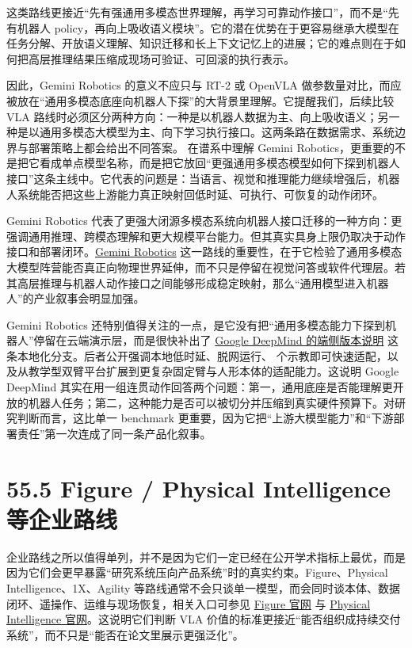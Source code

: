这类路线更接近“先有强通用多模态世界理解，再学习可靠动作接口”，而不是“先有机器人 policy，再向上吸收语义模块”。它的潜在优势在于更容易继承大模型在任务分解、开放语义理解、知识迁移和长上下文记忆上的进展；它的难点则在于如何把高层推理结果压缩成现场可验证、可回滚的执行表示。

因此，Gemini Robotics 的意义不应只与 RT-2 或 OpenVLA 做参数量对比，而应被放在“通用多模态底座向机器人下探”的大背景里理解。它提醒我们，后续比较 VLA 路线时必须区分两种方向：一种是以机器人数据为主、向上吸收语义；另一种是以通用多模态大模型为主、向下学习执行接口。这两条路在数据需求、系统边界与部署策略上都会给出不同答案。 在谱系中理解 Gemini Robotics，更重要的不是把它看成单点模型名称，而是把它放回“更强通用多模态模型如何下探到机器人接口”这条主线中。它代表的问题是：当语言、视觉和推理能力继续增强后，机器人系统能否把这些上游能力真正映射回低时延、可执行、可恢复的动作闭环。

Gemini Robotics 代表了更强大闭源多模态系统向机器人接口迁移的一种方向：更强调通用推理、跨模态理解和更大规模平台能力。但其真实具身上限仍取决于动作接口和部署闭环。\href{https://deepmind.google/blog/gemini-robotics-brings-ai-into-the-physical-world/}{Gemini Robotics} 这一路线的重要性，在于它检验了通用多模态大模型阵营能否真正向物理世界延伸，而不只是停留在视觉问答或软件代理层。若其高层推理与机器人动作接口之间能够形成稳定映射，那么“通用模型进入机器人”的产业叙事会明显加强。

Gemini Robotics 还特别值得关注的一点，是它没有把“通用多模态能力下探到机器人”停留在云端演示层，而是很快补出了 \href{https://deepmind.google/blog/gemini-robotics-on-device-brings-ai-to-local-robotic-devices/}{Google DeepMind 的端侧版本说明} 这条本地化分支。后者公开强调本地低时延、脱网运行、\texttt{} 个示教即可快速适配，以及从教学型双臂平台扩展到更复杂固定臂与人形本体的适配能力。这说明 Google DeepMind 其实在用一组连贯动作回答两个问题：第一，通用底座是否能理解更开放的机器人任务；第二，这种能力是否可以被切分并压缩到真实硬件预算下。对研究判断而言，这比单一 benchmark 更重要，因为它把“上游大模型能力”和“下游部署责任”第一次连成了同一条产品化叙事。

\section*{55.5 Figure / Physical Intelligence 等企业路线}


企业路线之所以值得单列，并不是因为它们一定已经在公开学术指标上最优，而是因为它们会更早暴露“研究系统压向产品系统”时的真实约束。Figure、Physical Intelligence、1X、Agility 等路线通常不会只谈单一模型，而会同时谈本体、数据闭环、遥操作、运维与现场恢复，相关入口可参见 \href{https://www.figure.ai/}{Figure 官网} 与 \href{https://www.physicalintelligence.company/}{Physical Intelligence 官网}。这说明它们判断 VLA 价值的标准更接近“能否组织成持续交付系统”，而不只是“能否在论文里展示更强泛化”。

